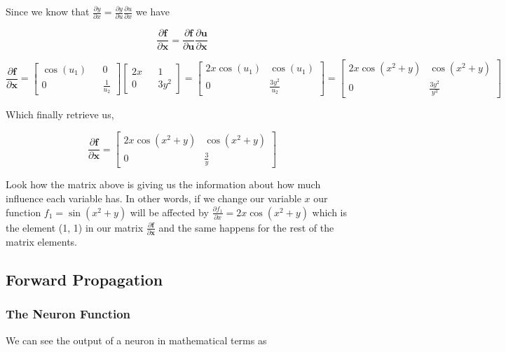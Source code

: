\documentclass[a4paper,10pt]{article}
\begin{document}
Since we know that $\frac{\partial y}{\partial x} = \frac{\partial y}{\partial u} \frac{\partial u}{\partial x}$ we have

$$
\frac{\partial \bm{f}}{\partial \bm{x}} = \frac{\partial \bm{f}}{\partial \bm{u}} \frac{\partial \bm{u}}{\partial \bm{x}}
$$

$$
\frac{\partial \bm{f}}{\partial \bm{x}} = \begin{bmatrix}
    \cos(u_1) && 0 \\
    0 && \frac{1}{u_2} 
\end{bmatrix} 
\begin{bmatrix}
    2x && 1 \\
    0 && 3y^2
\end{bmatrix} = \begin{bmatrix}
    2x\cos(u_1) & \cos(u_1) \\
    0 & \frac{3y^2}{u_2} 
\end{bmatrix} = \begin{bmatrix}
    2x\cos(x^2 + y) & \cos(x^2 + y) \\
    0 & \frac{3y^2}{y^3} 
\end{bmatrix}
$$

Which finally retrieve us, 

$$
    \frac{\partial \bm{f}}{\partial \bm{x}} = \begin{bmatrix}
        2x\cos(x^2 + y) & \cos(x^2 + y) \\
        0 & \frac{3}{y} 
    \end{bmatrix} 
$$

Look how the matrix above is giving us the information about how much influence each variable has. In other words, if we change our variable $x$ our function $f_1 = \sin(x^2 + y)$ will be affected by $\frac{\partial f_1}{\partial x} = 2x\cos(x^2 + y)$ which is the element (1, 1) in our matrix $\frac{\partial \bm{f}}{\partial \bm{x}}$ and the same happens for the rest of the matrix elements.

\subsection{Forward Propagation}

\subsubsection{The Neuron Function}

We can see the output of a neuron in mathematical terms as
\end{document}
